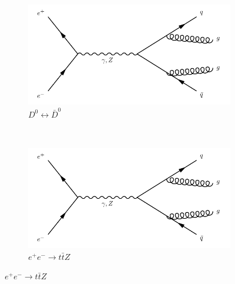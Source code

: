 \begin{figure}[h]
  \centering
  \begin{subfigure}[b]{0.3\textwidth}
    \includegraphics[width=\textwidth]{../Diagrams/D1.pdf}
    \caption{$D^0\longleftrightarrow \bar{D}^0$}
    \label{fey:19}
  \end{subfigure}
  ~
  \begin{subfigure}[b]{0.3\textwidth}
    \includegraphics[width=\textwidth]{../Diagrams/D1.pdf}
    \caption{$e^+e^- \rightarrow t\bar{t}Z$}
    \label{fey:20}
  \end{subfigure}
\end{figure}
\restoregeometry